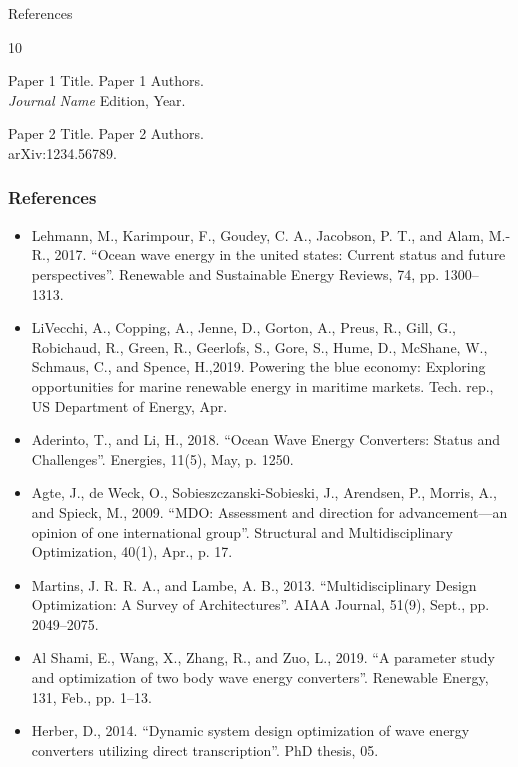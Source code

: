 

\begin{frame}{References}
	\begin{thebibliography}{10}
		\beamertemplatearticlebibitems
		{\small
			
			Paper 1 Title.
			\newblock Paper 1 Authors. \\
			{\it Journal Name} Edition, Year.
			
			Paper 2 Title.
			\newblock Paper 2 Authors.\\
			arXiv:1234.56789.
		}
	\end{thebibliography}
\end{frame}

\begin{frame}
	\frametitle{References}
	\begin{itemize}
		\item [1] Lehmann, M., Karimpour, F., Goudey, C. A., Jacobson, P. T., and Alam, M.-R., 2017. “Ocean wave energy in the united states: Current status and future perspectives”. Renewable and Sustainable Energy Reviews, 74, pp. 1300– 1313.
		\item [2] LiVecchi, A., Copping, A., Jenne, D., Gorton, A., Preus, R., Gill, G., Robichaud, R., Green, R., Geerlofs, S., Gore, S., Hume, D., McShane, W., Schmaus, C., and Spence, H.,2019. Powering the blue economy: Exploring opportunities for marine renewable energy in maritime markets. Tech. rep., US Department of Energy, Apr.
		\item [3] Aderinto, T., and Li, H., 2018. “Ocean Wave Energy Converters: Status and Challenges”. Energies, 11(5), May, p. 1250.
		\item [4] Agte, J., de Weck, O., Sobieszczanski-Sobieski, J., Arendsen, P., Morris, A., and Spieck, M., 2009. “MDO: Assessment and direction for advancement—an opinion of one international group”. Structural and Multidisciplinary Optimization, 40(1), Apr., p. 17.
		\item [5] Martins, J. R. R. A., and Lambe, A. B., 2013. “Multidisciplinary Design Optimization: A Survey of Architectures”. AIAA Journal, 51(9), Sept., pp. 2049–2075.
		\item [6] Al Shami, E., Wang, X., Zhang, R., and Zuo, L., 2019. “A parameter study and optimization of two body wave energy converters”. Renewable Energy, 131, Feb., pp. 1–13.
		\item [7] Herber, D., 2014. “Dynamic system design optimization of wave energy converters utilizing direct transcription”. PhD thesis, 05.

\end{itemize}
\end{frame}
